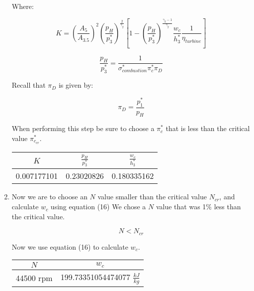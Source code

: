 \documentclass[titlepage]{article}
\begin{document}
\begin{enumerate}
  Where:

  \begin{equation}
    K = \left(\frac{A_{5}}{A_{3.5}}\right)^{2} \left(\frac{p_{H}}{p_{3}^{*}}\right)^{\frac{2}{\gamma_{g}}}\left[1 - \left(\frac{p_{H}}{p_{3}^{*}}\right)^{\frac{\gamma_{g}-1}{\gamma_{g}}} \frac{w_{c}}{h_{3}^{*}} \frac{1}{\eta_{turbine}}\right] 
  \end{equation}

  \begin{equation}
    \frac{p_{H}}{p_{3}^{*}} = \frac{1}{\sigma_{combustion}^{*} \pi_{c}^{*} \pi_{D}}
  \end{equation}

  Recall that $\pi_{D}$ is given by:

  \begin{equation}
    \pi_{D} = \frac{p_{1}^{*}}{p_{H}}
  \end{equation}

  When performing this step be sure to choose a $\pi_{c}^{*}$ that is less than the critical value $\pi_{c_{cr}}^{*}$.

  \begin{center}
    \begin{tabular}{|c|c|c|}
      \hline
      $K$ & $\frac{p_{H}}{p_{3}^{*}}$ & $\frac{w_{c}}{h_{3}^{*}}$ \\
      \hline
      0.007177101 & 0.23020826 & 0.180335162\\
      \hline
    \end{tabular}
  \end{center}

  \item Now we are to choose an $N$ value smaller than the critical value $N_{cr}$, and calculate $w_{c}$ using equation (16)
  We chose a $N$ value that was 1\% less than the critical value.

  \begin{equation}
    N < N_{cr}
  \end{equation}

  Now we use equation (16) to calculate $w_{c}$. 

  \begin{center}
    \begin{tabular}{|c|c|}
      \hline
      $N$ & $w_{c}$ \\
      \hline
      44500 rpm & 199.73351054474077 $\frac{kJ}{kg}$ \\
      \hline
    \end{tabular}
  \end{center}


\end{enumerate}
\end{document}
